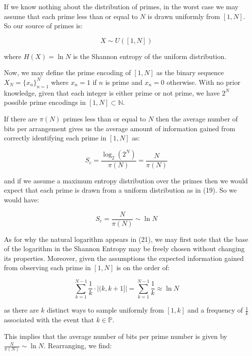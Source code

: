 \documentclass{article}
\begin{document}
If we know nothing about the distribution of primes, in the worst case we 
may assume that each prime less than or equal to $N$ is drawn uniformly from $[1,N]$. So our source of primes is: 

\begin{equation}
X \sim U([1,N])	
\end{equation}

where $H(X) = \ln N$ is the Shannon entropy of the uniform distribution. 

Now, we may define the prime encoding of $[1,N]$ as the binary sequence $X_N = \{x_n\}_{n=1}^N$ where $x_n = 1$ if $n$ is prime and $x_n = 0$ otherwise. With no prior knowledge, given that each integer is either prime or not prime, we have $2^N$ possible prime encodings in $[1,N] \subset \mathbb{N}$. 

If there are $\pi(N)$ primes less than or equal to $N$ then the average number of bits per arrangement gives us the average amount of information gained from correctly identifying each prime in $[1,N]$ as: 

\begin{equation}
S_c = \frac{\log_2 (2^N)}{\pi(N)} = \frac{N}{\pi(N)}	
\end{equation}

and if we assume a maximum entropy distribution over the primes then we would expect that each prime is drawn from a uniform distribution as in (19). So we would have: 

\begin{equation}
S_c = \frac{N}{\pi(N)} \sim \ln N	
\end{equation}

As for why the natural logarithm appears in (21), we may first note that the base of the logarithm in the Shannon Entropy may be freely chosen without changing its properties. Moreover, given the assumptions the expected information gained from observing each prime in $[1,N]$ is on the order of: 

\begin{equation}
\sum_{k=1}^{N-1} \frac{1}{k} \cdot |(k,k+1]| = \sum_{k=1}^{N-1} \frac{1}{k} \approx \ln N
\end{equation}

as there are $k$ distinct ways to sample uniformly from $[1,k]$ and a frequency of $\frac{1}{k}$ associated with the event that $k \in \mathbb{P}$. 

This implies that the average number of bits per prime number is given by $\frac{N}{\pi(N)} \sim \ln N$. Rearranging, we find: 
\end{document}

